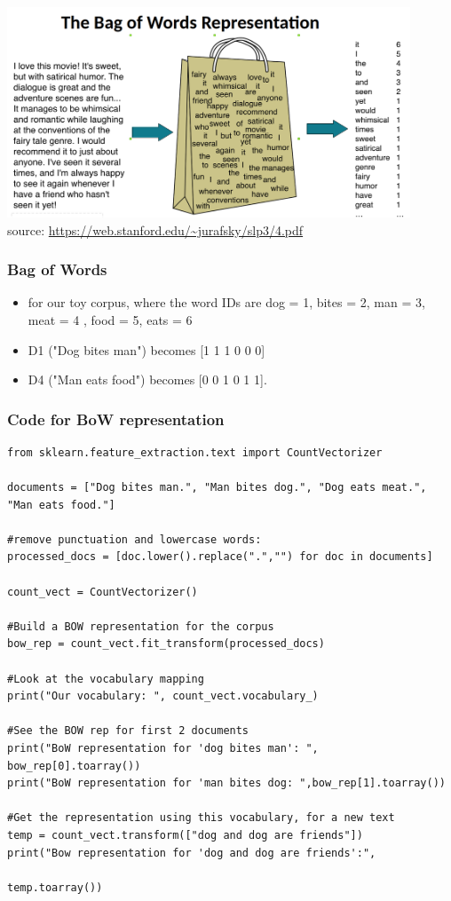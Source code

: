 \documentclass{beamer}
\begin{document}
\begin{frame}
\frametitle{}
\includegraphics[width=0.9\textwidth]{figures/bow.png}
\\ \tiny source: \url{https://web.stanford.edu/~jurafsky/slp3/4.pdf}
\end{frame}

\begin{frame}
\frametitle{Bag of Words}
\begin{itemize}
\item for our toy corpus, where the word IDs are dog = 1, bites = 2, man = 3, meat = 4 , food = 5, eats = 6
\item D1 ("Dog bites man") becomes [1 1 1 0 0 0]
\item D4 ("Man eats food") becomes [0 0 1 0 1 1].
\end{itemize}
\end{frame}


\begin{frame}[fragile]
\frametitle{Code for BoW representation}
\tiny
\begin{verbatim}
from sklearn.feature_extraction.text import CountVectorizer

documents = ["Dog bites man.", "Man bites dog.", "Dog eats meat.", "Man eats food."]

#remove punctuation and lowercase words:
processed_docs = [doc.lower().replace(".","") for doc in documents]

count_vect = CountVectorizer()

#Build a BOW representation for the corpus
bow_rep = count_vect.fit_transform(processed_docs)

#Look at the vocabulary mapping
print("Our vocabulary: ", count_vect.vocabulary_)

#See the BOW rep for first 2 documents
print("BoW representation for 'dog bites man': ", bow_rep[0].toarray())
print("BoW representation for 'man bites dog: ",bow_rep[1].toarray())

#Get the representation using this vocabulary, for a new text
temp = count_vect.transform(["dog and dog are friends"])
print("Bow representation for 'dog and dog are friends':", 

temp.toarray())
\end{verbatim}
\end{frame}
\end{document}

